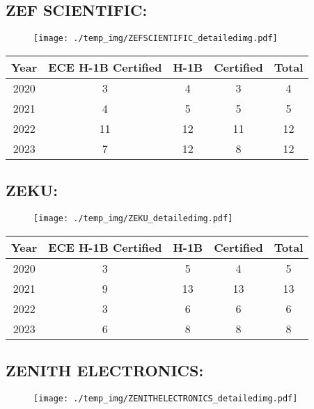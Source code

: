 \documentclass{article}%
\begin{document}
%
\newpage%
\subsection{ZEF SCIENTIFIC:}%
\label{subsec:ZEFSCIENTIFIC}%
\label{ZEFSCIENTIFICdetailed}%


\begin{figure}[htbp]%
\centering%
\texttt{[image: ./temp\_img/ZEFSCIENTIFIC\_detailedimg.pdf]}%
\end{figure}

%
\begin{longtable}{c|c|c|c|c}%
\hline%
Year&ECE H{-}1B Certified&H{-}1B&Certified&Total\\%
\hline%
2020&3&4&3&4\\%
\hline%
2021&4&5&5&5\\%
\hline%
2022&11&12&11&12\\%
\hline%
2023&7&12&8&12\\%
\hline%
\end{longtable}

%
\newpage%
\subsection{ZEKU:}%
\label{subsec:ZEKU}%
\label{ZEKUdetailed}%


\begin{figure}[htbp]%
\centering%
\texttt{[image: ./temp\_img/ZEKU\_detailedimg.pdf]}%
\end{figure}

%
\begin{longtable}{c|c|c|c|c}%
\hline%
Year&ECE H{-}1B Certified&H{-}1B&Certified&Total\\%
\hline%
2020&3&5&4&5\\%
\hline%
2021&9&13&13&13\\%
\hline%
2022&3&6&6&6\\%
\hline%
2023&6&8&8&8\\%
\hline%
\end{longtable}

%
\newpage%
\subsection{ZENITH ELECTRONICS:}%
\label{subsec:ZENITHELECTRONICS}%
\label{ZENITHELECTRONICSdetailed}%


\begin{figure}[htbp]%
\centering%
\texttt{[image: ./temp\_img/ZENITHELECTRONICS\_detailedimg.pdf]}%
\end{figure}
\end{document}
